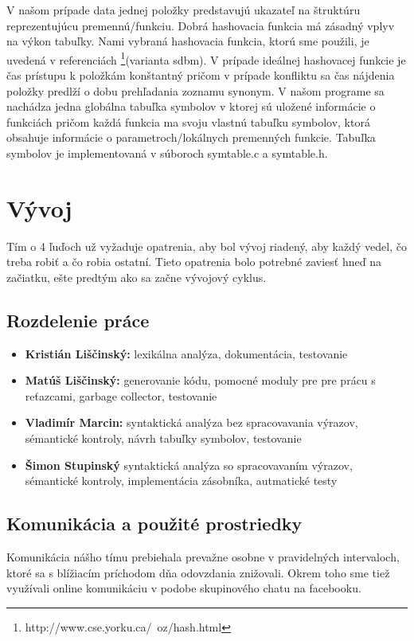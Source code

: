 \documentclass[11pt,a4paper]{article}
\begin{document}
	V našom prípade data jednej položky predstavujú ukazateľ na štruktúru reprezentujúcu 
	premennú/funkciu. Dobrá hashovacia funkcia má zásadný vplyv na výkon tabuľky. Nami vybraná hashovacia funkcia, ktorú sme použili, je 
	uvedená v referenciách \footnote{http://www.cse.yorku.ca/~oz/hash.html}(varianta sdbm). V prípade ideálnej hashovacej funkcie je čas prístupu k položkám konštantný pričom v prípade 
	konfliktu sa čas nájdenia položky predlží o dobu prehľadania zoznamu synonym.
	V našom programe sa nachádza jedna globálna tabuľka symbolov v ktorej sú uložené informácie o funkciách pričom každá funkcia ma svoju 
	vlastnú tabuľku symbolov, ktorá obsahuje informácie o parametroch/lokálnych premenných funkcie. 
	Tabuľka symbolov je implementovaná v súboroch symtable.c a symtable.h.


	

\section{Vývoj}
Tím o 4 ľuďoch už vyžaduje opatrenia, aby bol vývoj riadený, aby každý vedel, čo treba robiť a
čo robia ostatní. Tieto opatrenia bolo potrebné zaviesť hneď na začiatku, ešte predtým ako sa
začne vývojový cyklus.

	\subsection{Rozdelenie práce}
		\begin{itemize}
		\item 	\textbf{Kristián Liščinský:} lexikálna analýza, dokumentácia, testovanie
		\item 	\textbf{Matúš Liščinský:} generovanie kódu, pomocné moduly pre pre prácu s reťazcami, garbage collector, testovanie 
		\item 	\textbf{Vladimír Marcin:} syntaktická analýza bez spracovavania výrazov, sémantické kontroly, návrh tabuľky symbolov, testovanie
		\item 	\textbf{Šimon Stupinský} syntaktická analýza so spracovavaním výrazov, sémantické kontroly, implementácia zásobníka, autmatické testy
		\end{itemize}

	\subsection{Komunikácia a použité prostriedky}
	Komunikácia nášho tímu prebiehala prevažne osobne v pravidelných intervaloch, ktoré sa s blížiacím príchodom dňa odovzdania znižovali. Okrem toho sme tiež využívali online komunikáciu v podobe skupinového chatu na facebooku.
\end{document}
